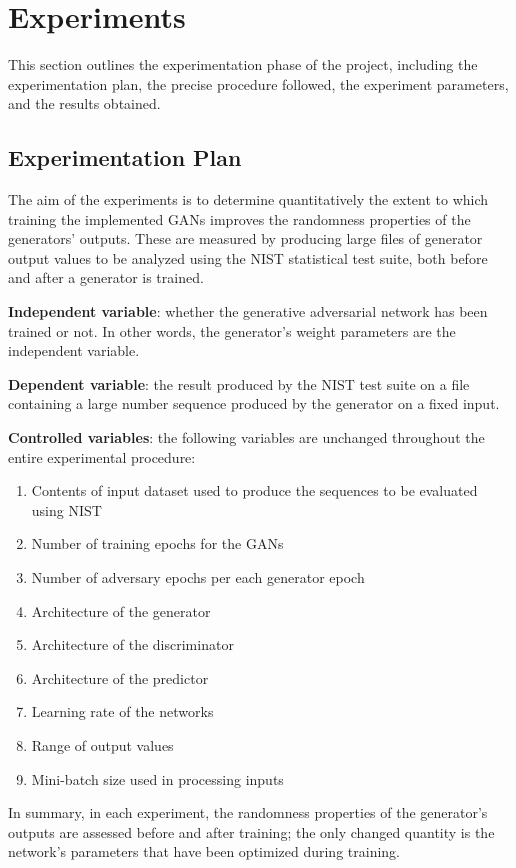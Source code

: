 \documentclass[12pt, titlepage]{report}
\theoremstyle{definition}
\begin{document}
\chapter{Experiments}\label{chapter:experiments}
This section outlines the experimentation phase of the project, including the experimentation plan, the precise procedure followed, the experiment parameters, and the results obtained.


\section{Experimentation Plan}
The aim of the experiments is to determine quantitatively the extent to which training the implemented GANs improves the randomness properties of the generators' outputs. These are measured by producing large files of generator output values to be analyzed using the NIST statistical test suite, both before and after a generator is trained.

\textbf{Independent variable}: whether the generative adversarial network has been trained or not. In other words, the generator's weight parameters are the independent variable.

\textbf{Dependent variable}: the result produced by the NIST test suite on a file containing a large number sequence produced by the generator on a fixed input.

\textbf{Controlled variables}: the following variables are unchanged throughout the entire experimental procedure:
\begin{enumerate}
    \itemsep0em
    \item Contents of input dataset used to produce the sequences to be evaluated using NIST
    \item Number of training epochs for the GANs
    \item Number of adversary epochs per each generator epoch
    \item Architecture of the generator
    \item Architecture of the discriminator
    \item Architecture of the predictor
    \item Learning rate of the networks
    \item Range of output values
    \item Mini-batch size used in processing inputs
\end{enumerate}

In summary, in each experiment, the randomness properties of the generator's outputs are assessed before and after training; the only changed quantity is the network's parameters that have been optimized during training.
\end{document}
